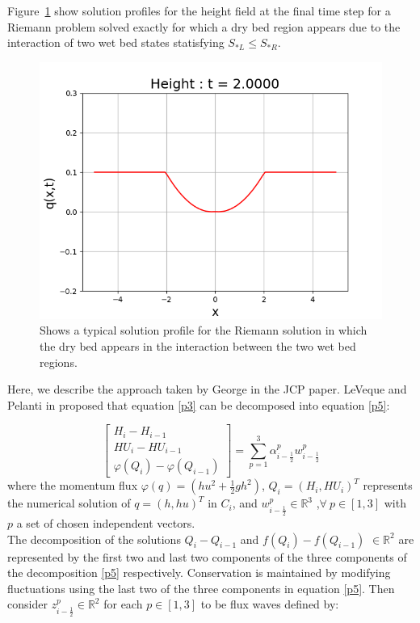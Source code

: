 \documentclass[12pt,a4paper]{article}
\begin{document}
	  Figure~\ref{fig:middle} show solution profiles for the height field at the final time step for a Riemann problem  solved exactly for which a dry bed region appears due to the interaction of two wet bed states statisfying $S_{*L} \le S_{*R}$.
\begin{figure}[H]
	\centering
	\includegraphics[width=0.8\linewidth]{images/middle}
	\caption{ Shows a typical solution profile for the Riemann solution in which the dry bed appears in the interaction between the two wet bed regions.}
	\label{fig:middle}
\end{figure}
	
	
Here, we describe the approach taken by George in the JCP paper\cite{ge:2008}. LeVeque and Pelanti in \cite{leveque2001class} proposed that equation \eqref{p3} can be decomposed into equation \eqref{p5}:
	
	\begin{equation}
		\begin{bmatrix} 
			H_{i} - H_{i-1}\\ 	HU_{i} - HU_{i-1} \\  \varphi(Q_{i}) - \varphi(Q_{i-1}) 
		\end{bmatrix} = \sum_{p=1}^{3} \alpha_{i-\frac{1}{2}}^{p} w_{i-\frac{1}{2}}^{p}
		\label{p5}
	\end{equation}
	 where the momentum flux $\varphi(q) = (hu^{2} + \frac{1}{2} gh^{2})$, $Q_{i} = (H_{i},HU_{i})^{T}$ represents the numerical solution of $q = (h,hu)^{T}$ in $C_{i}$, and $w_{i-\frac{1}{2}}^{p} \in \mathbb{R}^{3}$ ,$\forall ~ p \in [1,3] $ with $p$ a set of chosen independent vectors. \\
	
	 The decomposition of the solutions $Q_{i} - Q_{i-1} $  and  $f(Q_{i}) - f(Q_{i-1})$ $ \in  \mathbb{R}^{2}$ are represented by the first two and last two components of the three components of the decomposition \eqref{p5} respectively.  Conservation is maintained by modifying fluctuations using the last two of the three components  in equation \eqref{p5}. Then  consider $z_{i-\frac{1}{2}}^{p} \in \mathbb{R}^{2}$ for each $p \in [1,3]$ to be flux waves defined by:
	
\end{document}
